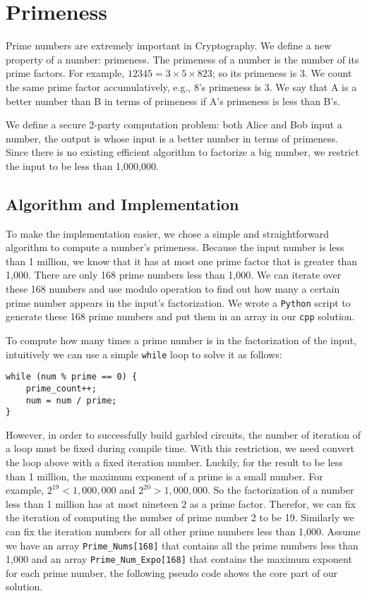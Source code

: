 \section{Primeness}
Prime numbers are extremely important in Cryptography. We define a new
property of a number: primeness. The primeness of a number is the number of
its prime factors. For example, $12345 = 3 \times 5 \times 823$;
so its primeness is 3.  We count the same prime factor accumulatively,
e.g., 8's primeness is 3.
We say that A is a better number than B in terms of primeness if A's primeness
is less than B's.

We define a secure 2-party computation problem: both Alice and Bob input
a number, the output is whose input is a better number in terms of primeness.
Since there is no existing efficient algorithm to factorize a big number,
we restrict the input to be less than 1,000,000.

\subsection{Algorithm and Implementation}
To make the implementation easier, we chose a simple and straightforward
algorithm to compute a number's primeness. Because the input number is
less than 1 million, we know that it has at most one prime factor that is
greater than 1,000. There are only 168 prime numbers less than 1,000.
We can iterate over these 168 numbers and use modulo operation to find out
how many a certain prime number appears in the input's factorization.
We wrote a {\tt Python} script to generate these 168 prime numbers and
put them in an array in our {\tt cpp} solution.

To compute how many times a prime number is in the factorization of the input,
intuitively we can use a simple {\tt while} loop to solve it as follows:

\begin{verbatim}
while (num % prime == 0) {
    prime_count++;
    num = num / prime;
}
\end{verbatim}

However, in order to successfully build garbled circuits, the number of
iteration of a loop must be fixed during compile time. With this restriction,
we need convert the loop above with a fixed iteration number.
Luckily, for the result to be less than 1 million, the maximum exponent of
a prime is a small number. For example, $2^{19} < 1,000,000$ and
$2^{20} > 1,000,000$. So the factorization of a number less than 1 million
has at most nineteen $2$ as a prime factor. Therefor, we can fix the
iteration of computing the number of prime number 2 to be 19. Similarly
we can fix the iteration numbers for all other prime numbers less than 1,000.
Assume we have an array {\tt Prime\_Nums[168]} that contains all the prime
numbers less than 1,000 and an array {\tt Prime\_Num\_Expo[168]} that
contains the maximum exponent for each prime number, the following
pseudo code shows the core part of our solution.

